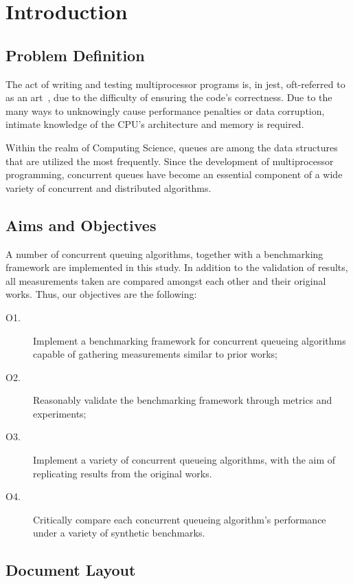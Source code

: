 \chapter{Introduction}
\section{Problem Definition}

The act of writing and testing multiprocessor programs is, in jest,
oft-referred to as an art~\citep{herlihy2020art}, due to the difficulty of
ensuring the code's correctness. 
Due to the many ways to unknowingly cause
performance penalties or data corruption, intimate knowledge of the CPU's
architecture and memory is required. 

Within the realm of Computing Science, queues are among the data structures that
are utilized the most frequently. Since the development of multiprocessor
programming, concurrent queues have become an essential component of a wide
variety of concurrent and distributed algorithms.

\section{Aims and Objectives}

A number of concurrent queuing algorithms, together with a benchmarking
framework are implemented in this study. In addition to the validation of results, all
measurements taken are compared amongst each other and their original works.
Thus, our objectives are the following:

\begin{description}
\item[O1.] Implement a benchmarking framework for concurrent queueing
algorithms capable of gathering measurements similar to prior works;
\item[O2.] Reasonably validate the benchmarking framework through
metrics and experiments;
\item[O3.] Implement a variety of concurrent queueing algorithms, with the aim
of replicating results from the original works.
\item[O4.] Critically compare each concurrent queueing algorithm's performance
under a variety of synthetic benchmarks.
\end{description}

\section{Document Layout}
